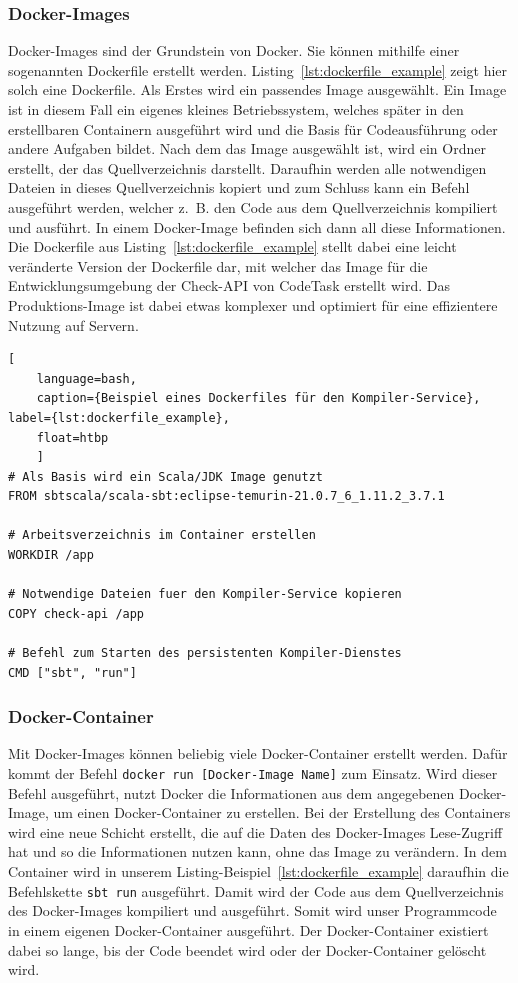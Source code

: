 \subsubsection{Docker-Images}
Docker-Images sind der Grundstein von Docker. Sie können mithilfe einer sogenannten Dockerfile erstellt werden. Listing~\ref{lst:dockerfile_example} zeigt hier solch eine Dockerfile. Als Erstes wird ein passendes Image ausgewählt. Ein Image ist in diesem Fall ein eigenes kleines Betriebssystem, welches später in den erstellbaren Containern ausgeführt wird und die Basis für Codeausführung oder andere Aufgaben bildet. Nach dem das Image ausgewählt ist, wird ein Ordner erstellt, der das Quellverzeichnis darstellt. Daraufhin werden alle notwendigen Dateien in dieses Quellverzeichnis kopiert und zum Schluss kann ein Befehl ausgeführt werden, welcher z.~B. den Code aus dem Quellverzeichnis kompiliert und ausführt. In einem Docker-Image befinden sich dann all diese Informationen.
Die Dockerfile aus Listing~\ref{lst:dockerfile_example} stellt dabei eine leicht veränderte Version der Dockerfile dar, mit welcher das Image für die Entwicklungsumgebung der Check-API von CodeTask erstellt wird. Das Produktions-Image ist dabei etwas komplexer und optimiert für eine effizientere Nutzung auf Servern.
	\begin{lstlisting}[
	language=bash,
	caption={Beispiel eines Dockerfiles für den Kompiler-Service}, label={lst:dockerfile_example},
	float=htbp
	]
# Als Basis wird ein Scala/JDK Image genutzt
FROM sbtscala/scala-sbt:eclipse-temurin-21.0.7_6_1.11.2_3.7.1

# Arbeitsverzeichnis im Container erstellen
WORKDIR /app

# Notwendige Dateien fuer den Kompiler-Service kopieren
COPY check-api /app

# Befehl zum Starten des persistenten Kompiler-Dienstes
CMD ["sbt", "run"]
	\end{lstlisting}

	\subsubsection{Docker-Container}
	Mit Docker-Images können beliebig viele Docker-Container erstellt werden. Dafür kommt der Befehl \texttt{docker run [Docker-Image Name]} zum Einsatz. Wird dieser Befehl ausgeführt, nutzt Docker die Informationen aus dem angegebenen Docker-Image, um einen Docker-Container zu erstellen. Bei der Erstellung des Containers wird eine neue Schicht erstellt, die auf die Daten des Docker-Images Lese-Zugriff hat und so die Informationen nutzen kann, ohne das Image zu verändern. In dem Container wird in unserem Listing-Beispiel~\ref{lst:dockerfile_example} daraufhin die Befehlskette \texttt{sbt run} ausgeführt. Damit wird der Code aus dem Quellverzeichnis des Docker-Images kompiliert und ausgeführt. Somit wird unser Programmcode in einem eigenen Docker-Container ausgeführt. Der Docker-Container existiert dabei so lange, bis der Code beendet wird oder der Docker-Container gelöscht wird.
	
